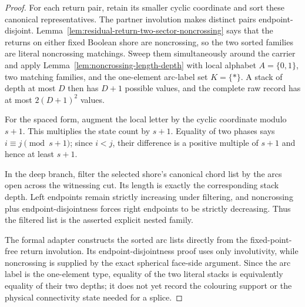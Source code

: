 \begin{proof}
For each return pair, retain its smaller cyclic coordinate and sort these
canonical representatives.  The partner involution makes distinct pairs
endpoint-disjoint.  Lemma~\ref{lem:residual-return-two-sector-noncrossing}
says that the returns on either fixed Boolean shore are noncrossing, so the
two sorted families are literal noncrossing matchings.  Sweep them
simultaneously around the carrier and apply
Lemma~\ref{lem:noncrossing-length-depth} with local alphabet
$A=\{0,1\}$, two matching families, and the one-element arc-label set
$K=\{*\}$.  A stack of depth at most $D$ then has $D+1$ possible
values, and the complete raw record has at most $2(D+1)^2$ values.

For the spaced form, augment the local letter by the cyclic coordinate
modulo $s+1$.  This multiplies the state count by $s+1$.  Equality of two
phases says $i\equiv j\pmod{s+1}$; since $i<j$, their difference is a
positive multiple of $s+1$ and hence at least $s+1$.

In the deep branch, filter the selected shore's canonical chord list by the
arcs open across the witnessing cut.  Its length is exactly the corresponding
stack depth.  Left endpoints remain strictly increasing under filtering, and
noncrossing plus endpoint-disjointness forces right endpoints to be strictly
decreasing.  Thus the filtered list is the asserted explicit nested family.

The formal adapter constructs the sorted arc lists directly from the
fixed-point-free return involution.  Its endpoint-disjointness proof uses
only involutivity, while noncrossing is supplied by the exact spherical
face-side argument.  Since the arc label is the one-element type, equality
of the two literal stacks is equivalently equality of their two depths; it
does not yet record the colouring support or the physical connectivity state
needed for a splice.
\end{proof}

